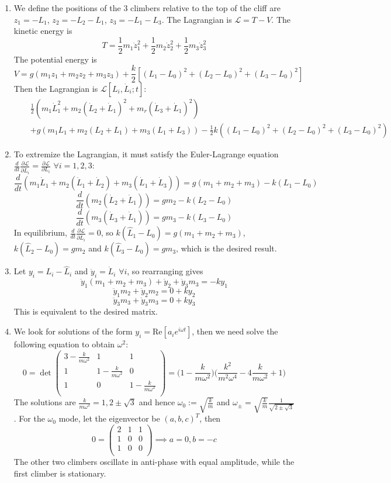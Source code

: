 \documentclass[a4paper]{article}
\begin{document}
\newpage
\begin{ans}\leavevmode
\begin{enumerate}[label=(\alph*)]
\item We define the positions of the 3 climbers relative to the top of the cliff are $z_1=-L_1$, $z_2=-L_2-L_1$, $z_3=-L_1-L_3$. The Lagrangian is $\mathcal{L}=T-V$. The kinetic energy is
$$T=\frac{1}{2}m_1\dot{z}_1^2+\frac{1}{2}m_2\dot{z}_2^2+\frac{1}{2}m_3\dot{z}_3^2$$
The potential energy is
$$V=g(m_1z_1+m_2z_2+m_3z_3)+\frac{k}{2}[(L_1-L_0)^2+(L_2-L_0)^2+(L_3-L_0)^2]$$
Then the Lagrangian is $\mathcal{L}[L_i,\dot{L}_i;t]$:
\begin{eqnarray}
&&\frac{1}{2}(m_1\dot{L}_1^2+m_2(\dot{L}_2+\dot{L}_1)^2+m_r(\dot{L}_3+\dot{L}_1)^2)\nonumber\\&&+g(m_1L_1+m_2(L_2+L_1)+m_3(L_1+L_3))-\frac{1}{2}k((L_1-L_0)^2+(L_2-L_0)^2+(L_3-L_0)^2)\nonumber
\end{eqnarray}
\item To extremize the Lagrangian, it must satisfy the Euler-Lagrange equation $\frac{d}{dt}\frac{\partial\mathcal{L}}{\partial\dot{L}_i}=\frac{\partial\mathcal{L}}{\partial L_i}$ $\forall i=1,2,3$:
$$\frac{d}{dt}(m_1\dot{L}_1+m_2(\dot{L}_1+\dot{L}_2)+m_3(\dot{L}_1+\dot{L}_3))=g(m_1+m_2+m_3)-k(L_1-L_0)$$
$$\frac{d}{dt}(m_2(\dot{L}_2+\dot{L}_1))=gm_2-k(L_2-L_0)$$
$$\frac{d}{dt}(m_3(\dot{L}_3+\dot{L}_1))=gm_3-k(L_3-L_0)$$
In equilibrium, $\frac{d}{dt}\frac{\partial\mathcal{L}}{\partial\dot{L}_i}=0$, so $k(\hat{L}_1-L_0)=g(m_1+m_2+m_3)$, $k(\hat{L}_2-L_0)=gm_2$ and $k(\hat{L}_3-L_0)=gm_3$, which is the desired result.
\item Let $y_i=L_i-\hat{L}_i$ and $\dot{y}_i=\dot{L}_i$ $\forall i$, so rearranging gives
$$\ddot{y}_1(m_1+m_2+m_3)+\ddot{y}_2+\ddot{y}_3m_3=-ky_1$$
$$\ddot{y}_1m_2+\ddot{y}_2m_2=0+ky_2$$
$$\ddot{y}_3m_3+\ddot{y}_3m_3=0+ky_3$$
This is equivalent to the desired matrix.
\item We look for solutions of the form $y_i=\text{Re}[a_ie^{i\omega t}]$, then we need solve the following equation to obtain $\omega^2$:
$$0=\det\begin{pmatrix}3-\frac{k}{m\omega^2}&1&1\\1&1-\frac{k}{m\omega^2}&0\\1&0&1-\frac{k}{m\omega^2}\\\end{pmatrix}=\bigg(1-\frac{k}{m\omega^2}\bigg)\bigg(\frac{k^2}{m^2\omega^4}-4\frac{k}{m\omega^2}+1\bigg)$$
The solutions are $\frac{k}{m\omega^2}=1,2\pm\sqrt{3}$ and hence $\omega_0:=\sqrt{\frac{k}{m}}$ and $\omega_\pm=\sqrt{\frac{k}{m}}\frac{1}{\sqrt{2\pm\sqrt{3}}}$.
For the $\omega_0$ mode, let the eigenvector be $(a,b,c)^T$, then
$$0=\begin{pmatrix}2&1&1\\1&0&0\\1&0&0\\\end{pmatrix}\implies a=0,b=-c$$
The other two climbers oscillate in anti-phase with equal amplitude, while the first climber is stationary.
\end{enumerate}
\end{ans}
\end{document}
